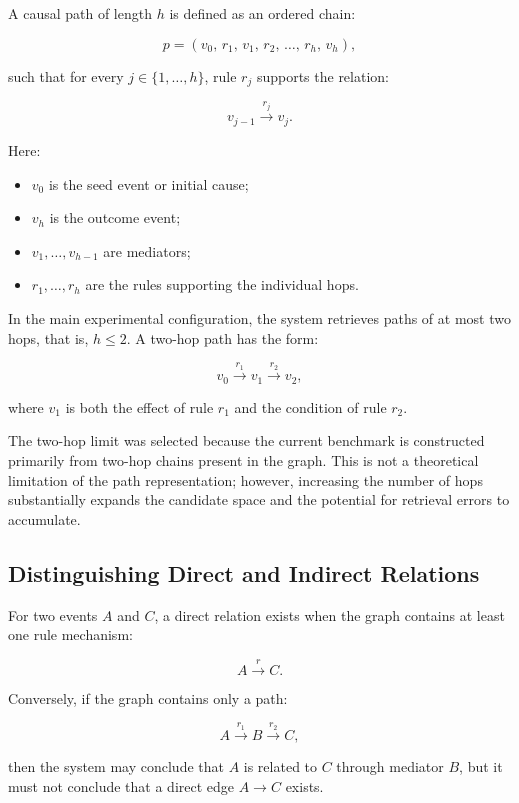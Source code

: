 A causal path of length \(h\) is defined as an ordered chain:

\begin{equation}
p =
\left(
    v_0,\,
    r_1,\,
    v_1,\,
    r_2,\,
    \ldots,\,
    r_h,\,
    v_h
\right),
\label{eq:path}
\end{equation}

such that for every \(j \in \{1,\ldots,h\}\), rule \(r_j\) supports the
relation:

\[
v_{j-1}
\xrightarrow{r_j}
v_j.
\]

Here:

\begin{itemize}
    \item \(v_0\) is the seed event or initial cause;
    \item \(v_h\) is the outcome event;
    \item \(v_1,\ldots,v_{h-1}\) are mediators;
    \item \(r_1,\ldots,r_h\) are the rules supporting the individual hops.
\end{itemize}

In the main experimental configuration, the system retrieves paths of at
most two hops, that is, \(h \leq 2\). A two-hop path has the form:

\[
v_0
\xrightarrow{r_1}
v_1
\xrightarrow{r_2}
v_2,
\]

where \(v_1\) is both the effect of rule \(r_1\) and the condition of rule
\(r_2\).

The two-hop limit was selected because the current benchmark is constructed
primarily from two-hop chains present in the graph. This is not a
theoretical limitation of the path representation; however, increasing the
number of hops substantially expands the candidate space and the potential
for retrieval errors to accumulate.

\subsection{Distinguishing Direct and Indirect Relations}

For two events \(A\) and \(C\), a direct relation exists when the graph
contains at least one rule mechanism:

\[
A \xrightarrow{r} C.
\]

Conversely, if the graph contains only a path:

\[
A \xrightarrow{r_1} B \xrightarrow{r_2} C,
\]

then the system may conclude that \(A\) is related to \(C\) through mediator
\(B\), but it must not conclude that a direct edge \(A \rightarrow C\)
exists.

